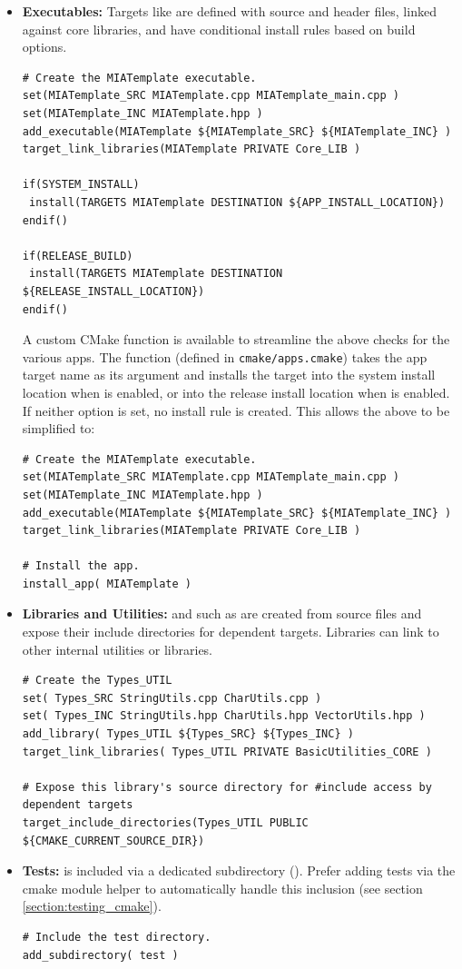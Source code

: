 \begin{itemize}\itemsep0em
	\item \textbf{Executables:} Targets like  are defined with source and header files, linked against core libraries, and have conditional install rules based on build options.
	\begin{lstlisting}[style=makestyle]
# Create the MIATemplate executable.
set(MIATemplate_SRC MIATemplate.cpp MIATemplate_main.cpp )
set(MIATemplate_INC MIATemplate.hpp )
add_executable(MIATemplate ${MIATemplate_SRC} ${MIATemplate_INC} )
target_link_libraries(MIATemplate PRIVATE Core_LIB )

if(SYSTEM_INSTALL)
 install(TARGETS MIATemplate DESTINATION ${APP_INSTALL_LOCATION})
endif()

if(RELEASE_BUILD)
 install(TARGETS MIATemplate DESTINATION ${RELEASE_INSTALL_LOCATION})
endif()
	\end{lstlisting}
	A custom  CMake function is available to streamline the above checks for the various apps. The function (defined in \texttt{cmake/apps.cmake}) takes the app target name as its argument and installs the target into the system install location when  is enabled, or into the release install location when  is enabled. If neither option is set, no install rule is created. This allows the above to be simplified to:
	\begin{lstlisting}[style=makestyle]
# Create the MIATemplate executable.
set(MIATemplate_SRC MIATemplate.cpp MIATemplate_main.cpp )
set(MIATemplate_INC MIATemplate.hpp )
add_executable(MIATemplate ${MIATemplate_SRC} ${MIATemplate_INC} )
target_link_libraries(MIATemplate PRIVATE Core_LIB )

# Install the app.
install_app( MIATemplate )
	\end{lstlisting}
	\item \textbf{Libraries and Utilities:}  and  such as  are created from source files and expose their include directories for dependent targets. Libraries can link to other internal utilities or libraries.
	\begin{lstlisting}[style=makestyle]
# Create the Types_UTIL
set( Types_SRC StringUtils.cpp CharUtils.cpp )
set( Types_INC StringUtils.hpp CharUtils.hpp VectorUtils.hpp )
add_library( Types_UTIL ${Types_SRC} ${Types_INC} )
target_link_libraries( Types_UTIL PRIVATE BasicUtilities_CORE )

# Expose this library's source directory for #include access by dependent targets
target_include_directories(Types_UTIL PUBLIC ${CMAKE_CURRENT_SOURCE_DIR})
	\end{lstlisting}
	\item \textbf{Tests:}  is included via a dedicated subdirectory (). Prefer adding tests via the cmake module helper to automatically handle this inclusion (see section \ref{section:testing_cmake}).
	\begin{lstlisting}[style=shellstyle]
# Include the test directory.
add_subdirectory( test )


\end{lstlisting}
\end{itemize}

